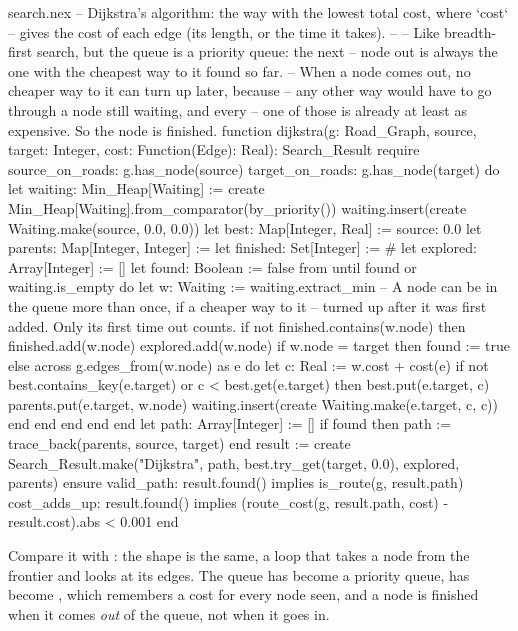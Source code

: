 \begin{append}{search.nex}
-- Dijkstra's algorithm: the way with the lowest total cost, where `cost`
-- gives the cost of each edge (its length, or the time it takes).
--
-- Like breadth-first search, but the queue is a priority queue: the next
-- node out is always the one with the cheapest way to it found so far.
-- When a node comes out, no cheaper way to it can turn up later, because
-- any other way would have to go through a node still waiting, and every
-- one of those is already at least as expensive. So the node is finished.
function dijkstra(g: Road_Graph, source, target: Integer,
  cost: Function(Edge): Real): Search_Result
require
  source_on_roads: g.has_node(source)
  target_on_roads: g.has_node(target)
do
  let waiting: Min_Heap[Waiting] := create Min_Heap[Waiting].from_comparator(by_priority())
  waiting.insert(create Waiting.make(source, 0.0, 0.0))
  let best: Map[Integer, Real] := {source: 0.0}
  let parents: Map[Integer, Integer] := {}
  let finished: Set[Integer] := #{}
  let explored: Array[Integer] := []
  let found: Boolean := false
  from
  until
    found or waiting.is_empty
  do
    let w: Waiting := waiting.extract_min
    -- A node can be in the queue more than once, if a cheaper way to it
    -- turned up after it was first added. Only its first time out counts.
    if not finished.contains(w.node) then
      finished.add(w.node)
      explored.add(w.node)
      if w.node = target then
        found := true
      else
        across g.edges_from(w.node) as e do
          let c: Real := w.cost + cost(e)
          if not best.contains_key(e.target) or c < best.get(e.target) then
            best.put(e.target, c)
            parents.put(e.target, w.node)
            waiting.insert(create Waiting.make(e.target, c, c))
          end
        end
      end
    end
  end
  let path: Array[Integer] := []
  if found then
    path := trace_back(parents, source, target)
  end
  result := create Search_Result.make("Dijkstra", path,
    best.try_get(target, 0.0), explored, parents)
ensure
  valid_path: result.found() implies is_route(g, result.path)
  cost_adds_up: result.found()
    implies (route_cost(g, result.path, cost) - result.cost).abs < 0.001
end
\end{append}

Compare it with : the shape is the same, a loop that
takes a node from the frontier and looks at its edges. The queue has become
a priority queue,  has become , which remembers a
cost for every node seen, and a node is finished when it comes \emph{out}
of the queue, not when it goes in.

